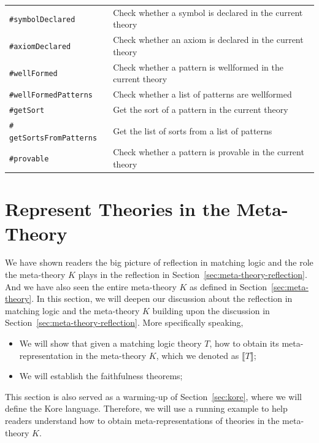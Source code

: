 \documentclass[UTF8,11pt]{article}
\theoremstyle{plain}
\theoremstyle{definition}
\theoremstyle{remark}
\newcommand{\denote}[1]{\llbracket{#1}\rrbracket}
\newcommand{\sharpsymbol}{\#}
\newcommand{\KsymbolDeclared}{\texttt{\sharpsymbol symbolDeclared}}
\newcommand{\KaxiomDeclared}{\texttt{\sharpsymbol axiomDeclared}}
\newcommand{\KwellFormed}{\texttt{\sharpsymbol wellFormed}}
\newcommand{\KwellFormedPatterns}{\texttt{\sharpsymbol wellFormedPatterns}}
\newcommand{\KgetSort}{\texttt{\sharpsymbol getSort}}
\newcommand{\KgetSortsFromPatterns}{\texttt{\sharpsymbol 
  getSortsFromPatterns}}
\newcommand{\Kdeduce}{\textup{\texttt{\sharpsymbol provable}}}
\begin{document}
\begin{longtable}{l|l}
	    \\
	    \KsymbolDeclared & Check whether a symbol is declared in the current 
	    theory \\
	    \KaxiomDeclared & Check whether an axiom is declared in the current 
	    theory \\
	    \KwellFormed & Check whether a pattern is wellformed in the current 
	    theory \\
	    \KwellFormedPatterns & Check whether a list of patterns are wellformed 
	    \\
	    \KgetSort & Get the sort of a pattern in the current theory \\
	    \KgetSortsFromPatterns & Get the list of sorts from a list of patterns 
	    \\
	    \Kdeduce & Check whether a pattern is provable in the current theory
	\end{longtable}


\section{Represent Theories in the Meta-Theory}
\label{sec:reflect}
We have shown readers the big picture of reflection in matching logic and  
the role the meta-theory $K$ plays in the reflection in 
Section~\ref{sec:meta-theory-reflection}.
And we have also seen the entire meta-theory $K$ as defined in 
Section~\ref{sec:meta-theory}.
In this section, we will deepen our discussion about the reflection in matching 
logic and the meta-theory $K$ building upon the discussion in 
Section~\ref{sec:meta-theory-reflection}.
More specifically speaking,
\begin{itemize}
	\item We will show that given a matching logic theory $T$, how to obtain 
	its meta-representation in the meta-theory $K$, which we denoted as 
	$\denote{T}$;
	\item We will establish the faithfulness theorems;
\end{itemize}
This section is also served as a warming-up of Section~\ref{sec:kore}, where we 
will define the Kore language.
Therefore, we will use a running example to help readers understand 
how to obtain meta-representations of theories in the meta-theory $K$.
\end{document}
